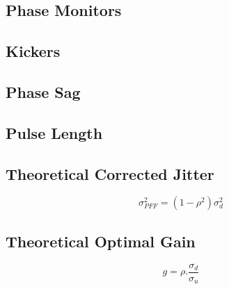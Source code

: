 \subsection{Phase Monitors}
\label{ss:phMons}

\subsection{Kickers}
\label{ss:kickers}


\subsection{Phase Sag}
\label{ss:phaseSag}

\subsection{Pulse Length}
\label{ss:pulseLength}


\subsection{Theoretical Corrected Jitter}
\label{ss:theoryJitter}

\begin{equation}
\sigma_{PFF}^2 = (1-\rho^2)\sigma_d^2
\label{e:theoretJitOptGain}
\end{equation}

\subsection{Theoretical Optimal Gain}
\label{ss:theoryGain}

\begin{equation}
g = \rho . \frac{\sigma_{d}}{\sigma_{u}}
\label{e:theoretOptGain}
\end{equation}
